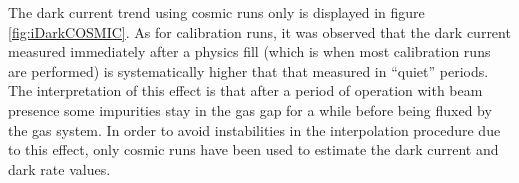 The dark current trend using cosmic runs only is displayed in figure \ref{fig:iDarkCOSMIC}. 
As for calibration runs, it was observed that the dark current measured immediately after a physics fill (which is when most calibration runs are performed) is systematically higher that that measured in “quiet” periods. 
The interpretation of this effect is that after a period of operation with beam presence some impurities stay in the gas gap for a while before being fluxed by the gas system.
In order to avoid instabilities in the interpolation procedure due to this effect, only cosmic runs have been used to estimate the dark current and dark rate values.

